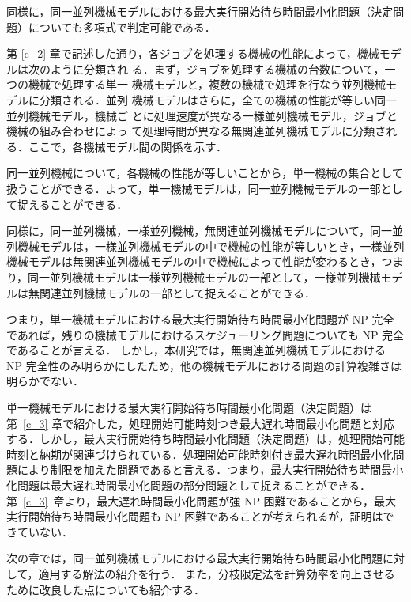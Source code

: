 \documentclass[12pt]{optlab-bachelor}
\begin{document}
同様に，同一並列機械モデルにおける最大実行開始待ち時間最小化問題（決定問題）についても多項式で判定可能である．


第 \ref{c_2} 章で記述した通り，各ジョブを処理する機械の性能によって，機械モデルは次のように分類され
る．まず，ジョブを処理する機械の台数について，一つの機械で処理する単一
機械モデルと，複数の機械で処理を行なう並列機械モデルに分類される．並列
機械モデルはさらに，全ての機械の性能が等しい同一並列機械モデル，機械ご
とに処理速度が異なる一様並列機械モデル，ジョブと機械の組み合わせによっ
て処理時間が異なる無関連並列機械モデルに分類される．ここで，各機械モデル間の関係を示す．

同一並列機械について，各機械の性能が等しいことから，単一機械の集合として扱うことができる．よって，単一機械モデルは，同一並列機械モデルの一部として捉えることができる．

同様に，同一並列機械，一様並列機械，無関連並列機械モデルについて，同一並列機械モデルは，一様並列機械モデルの中で機械の性能が等しいとき，一様並列機械モデルは無関連並列機械モデルの中で機械によって性能が変わるとき，つまり，同一並列機械モデルは一様並列機械モデルの一部として，一様並列機械モデルは無関連並列機械モデルの一部として捉えることができる．

つまり，単一機械モデルにおける最大実行開始待ち時間最小化問題が NP 完全であれば，残りの機械モデルにおけるスケジューリング問題についても NP 完全であることが言える．
しかし，本研究では，無関連並列機械モデルにおける NP 完全性のみ明らかにしたため，他の機械モデルにおける問題の計算複雑さは明らかでない．

単一機械モデルにおける最大実行開始待ち時間最小化問題（決定問題）は第~\ref{c_3} 章で紹介した，処理開始可能時刻つき最大遅れ時間最小化問題と対応する．しかし，最大実行開始待ち時間最小化問題（決定問題）は，処理開始可能時刻と納期が関連づけられている．処理開始可能時刻付き最大遅れ時間最小化問題により制限を加えた問題であると言える．つまり，最大実行開始待ち時間最小化問題は最大遅れ時間最小化問題の部分問題として捉えることができる．第~\ref{c_3}~章より，最大遅れ時間最小化問題が強 NP 困難であることから，最大実行開始待ち時間最小化問題も NP 困難であることが考えられるが，証明はできていない．

次の章では，同一並列機械モデルにおける最大実行開始待ち時間最小化問題に対して，適用する解法の紹介を行う．
また，分枝限定法を計算効率を向上させるために改良した点についても紹介する．
\end{document}
